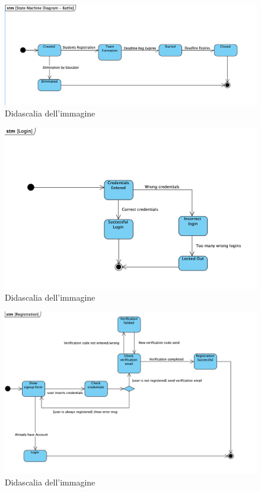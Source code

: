     \begin{figure}[H]
  \includegraphics[width=1\linewidth]{StateChart/BattleStateChart.png} 
  \caption{Didascalia dell'immagine}
  \label{fig:immagine}
\end{figure}
    \begin{figure}[H]
  \includegraphics[width=1\linewidth]{StateChart/LoginStateChart.png} 
  \caption{Didascalia dell'immagine}
  \label{fig:immagine}
\end{figure}
    \begin{figure}[H]
  \includegraphics[width=1\linewidth]{StateChart/RegStateChart.png} 
  \caption{Didascalia dell'immagine}
  \label{fig:immagine}
\end{figure}
